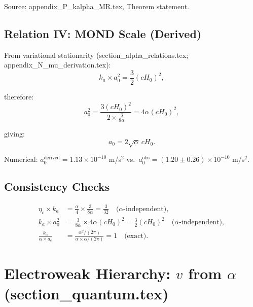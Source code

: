 \documentclass[11pt]{article}
\begin{document}
Source: appendix\_P\_kalpha\_MR.tex, Theorem statement.

\subsection{Relation IV: MOND Scale (Derived)}

From variational stationarity (section\_alpha\_relations.tex; appendix\_N\_mu\_derivation.tex):
\begin{equation}\tag{AR-5}
k_a \times a_0^2 = \frac{3}{2}(cH_0)^2,
\end{equation}

therefore:
\begin{equation}\tag{AR-6}
a_0^2 = \frac{3(cH_0)^2}{2 \times \frac{3}{8\alpha}} = 4\alpha(cH_0)^2,
\end{equation}

giving:
\begin{equation}\tag{AR-7}
\boxed{a_0 = 2\sqrt{\alpha}\,cH_0.}
\end{equation}

Numerical: $a_0^{\mathrm{derived}} = 1.13 \times 10^{-10}$ m/s$^2$ vs.\ $a_0^{\mathrm{obs}} = (1.20 \pm 0.26) \times 10^{-10}$ m/s$^2$.

\subsection{Consistency Checks}

\begin{align}
\eta_c \times k_a &= \frac{\alpha}{4} \times \frac{3}{8\alpha} = \frac{3}{32} \quad\text{($\alpha$-independent)}, \tag{CC-1} \\
k_a \times a_0^2 &= \frac{3}{8\alpha} \times 4\alpha(cH_0)^2 = \frac{3}{2}(cH_0)^2 \quad\text{($\alpha$-independent)}, \tag{CC-2} \\
\frac{k_\alpha}{\alpha \times a_e} &= \frac{\alpha^2/(2\pi)}{\alpha \times \alpha/(2\pi)} = 1 \quad\text{(exact)}. \tag{CC-3}
\end{align}

\section{Electroweak Hierarchy: $v$ from $\alpha$ (section\_quantum.tex)}
\end{document}
